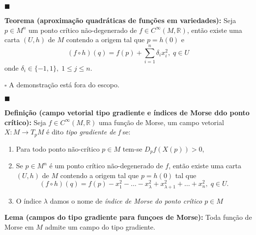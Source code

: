 \documentclass{article}
\begin{document}
	$\blacksquare$
	
	\vspace{2mm}
	\textbf{Teorema (aproximação quadráticas de funções em variedades):} Seja $p \in M^{n}$ um ponto crítico não-degenerado de $f \in C^{\infty}(M, \mathbb{R})$, então existe uma carta $(U, h)$ de $M$ contendo a origem tal que $p = h(0)$ e 
	$$
	(f \circ h) (q) = f(p) + \sum_{i=1}^{n}\delta_{i}x_{i}^{2}, \; q \in U
	$$
	onde $\delta_{i} \in \{-1,1\}, \; 1\leq j \leq n$.
	
	$\square$ A demonstração está fora do escopo.	
	
	$\blacksquare$
	
	\vspace{2mm}
	\textbf{Definição (campo vetorial tipo gradiente e índices de Morse ddo ponto crítico):} Seja $f \in C^{\infty}(M, \mathbb{R})$ uma função de Morse, um campo vetorial $X : M \to T_{p}M$ é dito \textit{tipo gradiente de f} se:
	\begin{enumerate}
		\item Para todo ponto não-crítico $p \in M$ tem-se 	
		$D_{p}f(X(p)) > 0$,
		
		\item Se $p \in M^{n}$ é um ponto crítico não-degenerado de $f$, então existe uma carta $(U, h)$ de $M$ contendo a origem tal que $p = h(0)$ tal que
		$$
		(f \circ h) (q) = f(p) - x_{1}^{2} - \dots - x_{\lambda}^{2} + x_{\lambda + 1}^{2} + \dots + x_{n}^{2}, \; q \in U.
		$$ 
		
		\item O índice $\lambda$ damos o nome de \textit{índice de Morse do ponto crítico $p \in M$}
	\end{enumerate}
	
	\vspace{2mm}
	\textbf{Lema (campos do tipo gradiente para funçoes de Morse):} Toda função de Morse em $M$ admite um campo do tipo gradiente.
	
\end{document}
